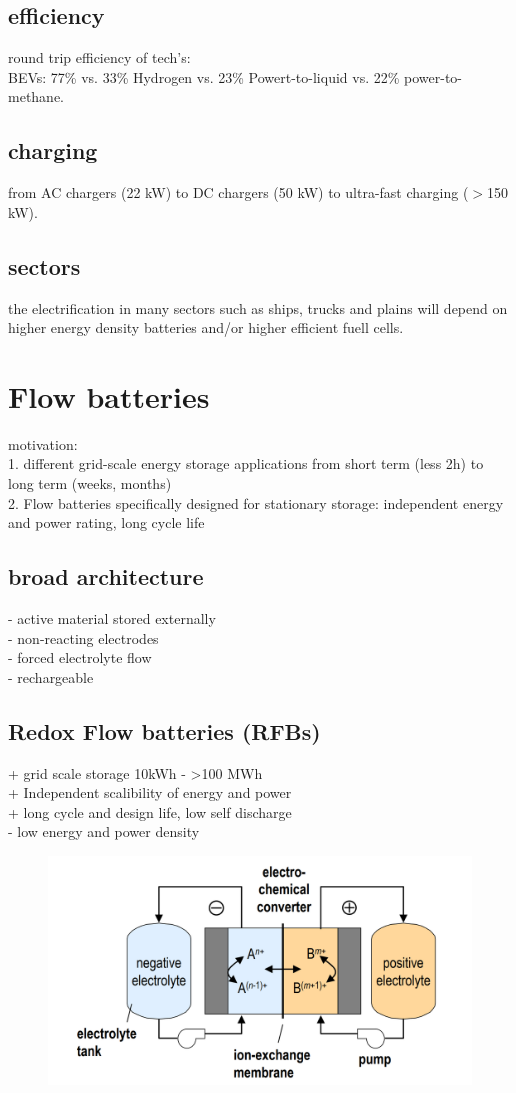 \documentclass[a4paper,10pt,landscape]{scrartcl}
\begin{document}
\begin{multicols*}{3}
\subsection{efficiency}
round trip efficiency of tech's: \\
BEVs: 77\% vs. 33\% Hydrogen vs. 23\% Powert-to-liquid vs. 22\% power-to-methane.
\subsection{charging}
from AC chargers (22 kW) to DC chargers (50 kW) to ultra-fast charging ($>$150 kW).
\subsection{sectors}
the electrification in many sectors such as ships, trucks and plains will depend on higher energy density batteries and/or higher efficient fuell cells.

\section{Flow batteries}
motivation:  \\
1. different grid-scale energy storage applications from short term (less 2h) to long term (weeks, months) \\
2. Flow batteries specifically designed for stationary storage: independent energy and power rating, long cycle life
\subsection{broad architecture}
- active material stored externally \\
- non-reacting electrodes \\
- forced electrolyte flow \\
- rechargeable 
\subsection{Redox Flow batteries (RFBs)}
+ grid scale storage 10kWh - >100 MWh \\
+ Independent scalibility of energy and power \\
+ long cycle and design life, low self discharge \\
- low energy and power density \\
\begin{figure}[H]
    \centering
    \includegraphics[width=0.75\linewidth]{src/RFB.png}
\end{figure}

\end{multicols*}
\end{document}
